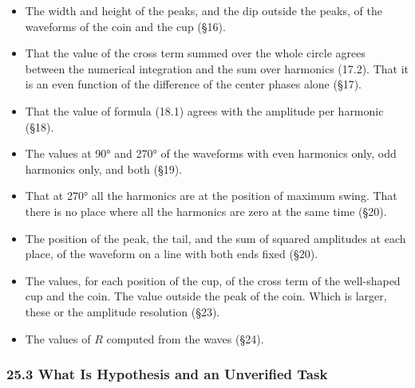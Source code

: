 \documentclass[
  a4paper,
]{article}
\providecommand{\tightlist}{%
  \setlength{\itemsep}{0pt}\setlength{\parskip}{0pt}}
\begin{document}
\begin{itemize}
\tightlist
\item
  The width and height of the peaks, and the dip outside the peaks, of
  the waveforms of the coin and the cup (§16).
\item
  That the value of the cross term summed over the whole circle agrees
  between the numerical integration and the sum over harmonics (17.2).
  That it is an even function of the difference of the center phases
  alone (§17).
\item
  That the value of formula (18.1) agrees with the amplitude per
  harmonic (§18).
\item
  The values at 90° and 270° of the waveforms with even harmonics only,
  odd harmonics only, and both (§19).
\item
  That at 270° all the harmonics are at the position of maximum swing.
  That there is no place where all the harmonics are zero at the same
  time (§20).
\item
  The position of the peak, the tail, and the sum of squared amplitudes
  at each place, of the waveform on a line with both ends fixed (§20).
\item
  The values, for each position of the cup, of the cross term of the
  well-shaped cup and the coin. The value outside the peak of the coin.
  Which is larger, these or the amplitude resolution (§23).
\item
  The values of \(R\) computed from the waves (§24).
\end{itemize}

\subsubsection{25.3 What Is Hypothesis and an Unverified
Task}\label{what-is-hypothesis-and-an-unverified-task}
\end{document}
